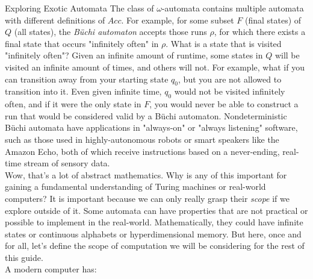 \begin{bluebox}{Exploring Exotic Automata}
    The class of $\omega$-automata contains multiple automata with different definitions of $Acc$. For example, for some subset $F$ (final states) of $Q$ (all states), the \textit{B\"{u}chi automaton} accepts those runs $\rho$, for which there exists a final state that occurs "infinitely often" in $\rho$. What is a state that is visited "infinitely often"? Given an infinite amount of runtime, some states in $Q$ will be visited an infinite amount of times, and others will not. For example, what if you can transition away from your starting state $q_0$, but you are not allowed to transition into it. Even given infinite time, $q_0$ would not be visited infinitely often, and if it were the only state in $F$, you would never be able to construct a run that would be considered valid by a B\"{u}chi automaton. Nondeterministic B\"{u}chi automata have applications in "always-on" or "always listening" software, such as those used in highly-autonomous robots or smart speakers like the Amazon Echo, both of which receive instructions based on a never-ending, real-time stream of sensory data. \\
        
    Wow, that's a lot of abstract mathematics. Why is any of this important for gaining a fundamental understanding of Turing machines or real-world computers? It is important because we can only really grasp their \textit{scope} if we explore outside of it. Some automata can have properties that are not practical or possible to implement in the real-world. Mathematically, they could have infinite states or continuous alphabets or hyperdimensional memory. But here, once and for all, let's define the scope of computation we will be considering for the rest of this guide. \\
        
    A modern computer has:
        

\end{bluebox}
